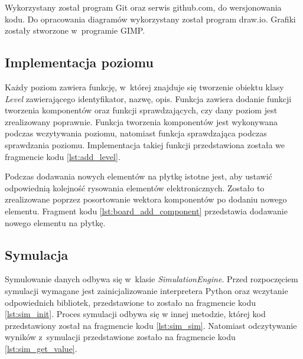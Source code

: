 \documentclass[12pt, a4paper]{article} %
\begin{document}
\aka Wykorzystany został program Git oraz serwis github.com, do wersjonowania kodu. Do opracowania diagramów wykorzystany został program draw.io. Grafiki zostały stworzone w~programie GIMP.


\subsection{Implementacja poziomu}

\aka Każdy poziom zawiera funkcję, w~której znajduje się tworzenie obiektu klasy \textit{Level} zawierającego identyfikator, nazwę, opis. Funkcja zawiera dodanie funkcji tworzenia komponentów oraz funkcji sprawdzających, czy dany poziom jest zrealizowany poprawnie. Funkcja tworzenia komponentów jest wykonywana podczas wczytywania poziomu, natomiast funkcja sprawdzająca podczas sprawdzania poziomu. Implementacja takiej funkcji przedstawiona została we fragmencie kodu \ref{lst:add_level}.



\aka Podczas dodawania nowych elementów na płytkę istotne jest, aby ustawić odpowiednią kolejność rysowania elementów elektronicznych. Zostało to zrealizowane poprzez posortowanie wektora komponentów po dodaniu nowego elementu. Fragment kodu \ref{lst:board_add_component} przedstawia dodawanie nowego elementu na płytkę.

\newpage


\subsection{Symulacja}
\aka Symulowanie danych odbywa się w~klasie \textit{SimulationEngine}. Przed rozpoczęciem symulacji wymagane jest zainicjalizowanie interpretera Python oraz wczytanie odpowiednich bibliotek, przedstawione to zostało na fragmencie kodu \ref{lst:sim_init}. Proces symulacji odbywa się w innej metodzie, której kod przedstawiony został na fragmencie kodu \ref{lst:sim_sim}. Natomiast odczytywanie wyników z~symulacji przedstawione zostało na fragmencie kodu \ref{lst:sim_get_value}.
\end{document}
